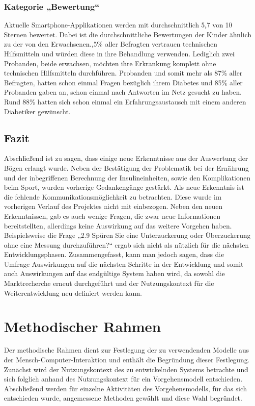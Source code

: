 \documentclass[a4paper,11pt]{article}%
\renewcommand{\\}{\vspace*{0.5\baselineskip} \newline}
\begin{document}
	\subsubsection{Kategorie „Bewertung“}
	Aktuelle Smartphone-Applikationen werden mit durchschnittlich 5,7 von 10 Sternen bewertet. Dabei ist die durchschnittliche Bewertungen der Kinder ähnlich zu der von den Erwachsenen.,5\% aller Befragten vertrauen technischen Hilfsmitteln und würden diese in ihre Behandlung verwenden. Lediglich zwei Probanden, beide erwachsen, möchten ihre Erkrankung komplett ohne technischen Hilfsmitteln durchführen. Probanden und somit mehr als 87\% aller Befragten, hatten schon einmal Fragen bezüglich ihrem Diabetes und 85\% aller Probanden gaben an, schon einmal nach Antworten im Netz gesucht zu haben. Rund 88\% hatten sich schon einmal ein Erfahrungsaustausch mit einem anderen Diabetiker gewünscht.
	\subsection{Fazit}
	Abschließend ist zu sagen, dass einige neue Erkenntnisse aus der Auswertung der Bögen erlangt wurde. Neben der Bestätigung der Problematik bei der Ernährung und der inbegriffenen Berechnung der Insulineinheiten, sowie den Komplikationen beim Sport, wurden vorherige Gedankengänge gestärkt. Als neue Erkenntnis ist die fehlende Kommunikationsmöglichkeit zu betrachten. Diese wurde im vorherigen Verlauf des Projektes nicht mit einbezogen. Neben den neuen Erkenntnissen, gab es auch wenige Fragen, die zwar neue Informationen bereitstellten, allerdings keine Auswirkung auf das weitere Vorgehen haben. Beispielsweise die Frage „2.9 Spüren Sie eine Unterzuckerung oder Überzuckerung ohne eine Messung durchzuführen?“ ergab sich nicht als nützlich für die nächsten Entwicklungsphasen. Zusammengefasst, kann man jedoch sagen, dass die Umfrage Auswirkungen auf die nächsten Schritte in der Entwicklung und somit auch Auswirkungen auf das endgültige System haben wird, da sowohl die Marktrecherche erneut durchgeführt und der Nutzungskontext für die Weiterentwicklung neu definiert werden kann.
	\newpage
	\section{Methodischer Rahmen}
	\label{section:Rahmen}
	Der methodische Rahmen dient zur Festlegung der zu verwendenden Modelle aus der Mensch-Computer-Interaktion und enthält die Begründung dieser Festlegung. Zunächst wird der Nutzungskontext des zu entwickelnden Systems betrachte und sich folglich anhand des Nutzungskontext für ein Vorgehensmodell entschieden. Abschließend werden für einzelne Aktivitäten des Vorgehensmodells, für das sich entschieden wurde, angemessene Methoden gewählt und diese Wahl begründet.
\end{document}
